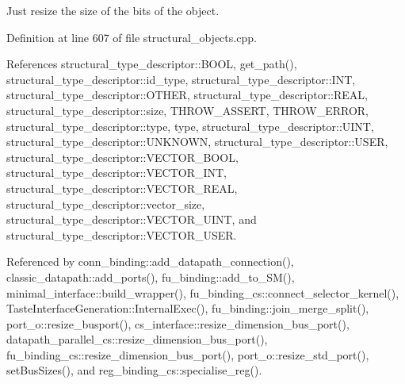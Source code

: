 Just resize the size of the bits of the object. 



Definition at line 607 of file structural\+\_\+objects.\+cpp.



References structural\+\_\+type\+\_\+descriptor\+::\+B\+O\+OL, get\+\_\+path(), structural\+\_\+type\+\_\+descriptor\+::id\+\_\+type, structural\+\_\+type\+\_\+descriptor\+::\+I\+NT, structural\+\_\+type\+\_\+descriptor\+::\+O\+T\+H\+ER, structural\+\_\+type\+\_\+descriptor\+::\+R\+E\+AL, structural\+\_\+type\+\_\+descriptor\+::size, T\+H\+R\+O\+W\+\_\+\+A\+S\+S\+E\+RT, T\+H\+R\+O\+W\+\_\+\+E\+R\+R\+OR, structural\+\_\+type\+\_\+descriptor\+::type, type, structural\+\_\+type\+\_\+descriptor\+::\+U\+I\+NT, structural\+\_\+type\+\_\+descriptor\+::\+U\+N\+K\+N\+O\+WN, structural\+\_\+type\+\_\+descriptor\+::\+U\+S\+ER, structural\+\_\+type\+\_\+descriptor\+::\+V\+E\+C\+T\+O\+R\+\_\+\+B\+O\+OL, structural\+\_\+type\+\_\+descriptor\+::\+V\+E\+C\+T\+O\+R\+\_\+\+I\+NT, structural\+\_\+type\+\_\+descriptor\+::\+V\+E\+C\+T\+O\+R\+\_\+\+R\+E\+AL, structural\+\_\+type\+\_\+descriptor\+::vector\+\_\+size, structural\+\_\+type\+\_\+descriptor\+::\+V\+E\+C\+T\+O\+R\+\_\+\+U\+I\+NT, and structural\+\_\+type\+\_\+descriptor\+::\+V\+E\+C\+T\+O\+R\+\_\+\+U\+S\+ER.



Referenced by conn\+\_\+binding\+::add\+\_\+datapath\+\_\+connection(), classic\+\_\+datapath\+::add\+\_\+ports(), fu\+\_\+binding\+::add\+\_\+to\+\_\+\+S\+M(), minimal\+\_\+interface\+::build\+\_\+wrapper(), fu\+\_\+binding\+\_\+cs\+::connect\+\_\+selector\+\_\+kernel(), Taste\+Interface\+Generation\+::\+Internal\+Exec(), fu\+\_\+binding\+::join\+\_\+merge\+\_\+split(), port\+\_\+o\+::resize\+\_\+busport(), cs\+\_\+interface\+::resize\+\_\+dimension\+\_\+bus\+\_\+port(), datapath\+\_\+parallel\+\_\+cs\+::resize\+\_\+dimension\+\_\+bus\+\_\+port(), fu\+\_\+binding\+\_\+cs\+::resize\+\_\+dimension\+\_\+bus\+\_\+port(), port\+\_\+o\+::resize\+\_\+std\+\_\+port(), set\+Bus\+Sizes(), and reg\+\_\+binding\+\_\+cs\+::specialise\+\_\+reg().

